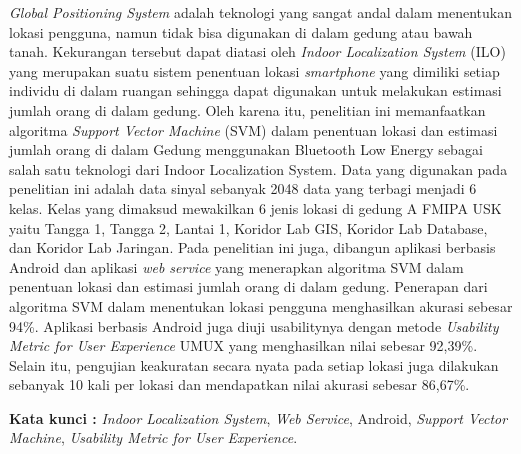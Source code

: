 \begin{abstractind}
    \textit{Global Positioning System} adalah teknologi yang sangat andal dalam menentukan lokasi pengguna, namun tidak bisa digunakan di dalam gedung atau bawah tanah. Kekurangan tersebut dapat diatasi oleh \textit{Indoor Localization System} (ILO) yang merupakan suatu sistem penentuan lokasi \textit{smartphone} yang dimiliki setiap individu di dalam ruangan sehingga dapat digunakan untuk melakukan estimasi jumlah orang di dalam gedung. Oleh karena itu, penelitian ini memanfaatkan algoritma \textit{Support Vector Machine} (SVM) dalam penentuan lokasi dan estimasi jumlah orang di dalam Gedung menggunakan Bluetooth Low Energy sebagai salah satu teknologi dari Indoor Localization System. Data yang digunakan pada penelitian ini adalah data sinyal sebanyak 2048 data yang terbagi menjadi 6 kelas. Kelas yang dimaksud mewakilkan 6 jenis lokasi di gedung A FMIPA USK yaitu Tangga 1, Tangga 2, Lantai 1, Koridor Lab GIS, Koridor Lab Database, dan Koridor Lab Jaringan. Pada penelitian ini juga, dibangun aplikasi berbasis Android dan aplikasi \textit{web service} yang menerapkan algoritma SVM dalam penentuan lokasi dan estimasi jumlah orang di dalam gedung. Penerapan dari algoritma SVM dalam menentukan lokasi pengguna menghasilkan akurasi sebesar 94\%. Aplikasi berbasis Android juga diuji usabilitynya dengan metode \textit{Usability Metric for User Experience} UMUX yang menghasilkan nilai  sebesar 92,39\%. Selain itu, pengujian keakuratan secara nyata  pada setiap lokasi juga dilakukan sebanyak 10 kali per lokasi dan mendapatkan nilai akurasi sebesar 86,67\%.

    \bigskip
    \noindent
    \textbf{Kata kunci :} \textit{Indoor Localization System}, \textit{Web Service}, Android, \textit{Support Vector Machine}, \textit{Usability Metric for User Experience}.
\end{abstractind}